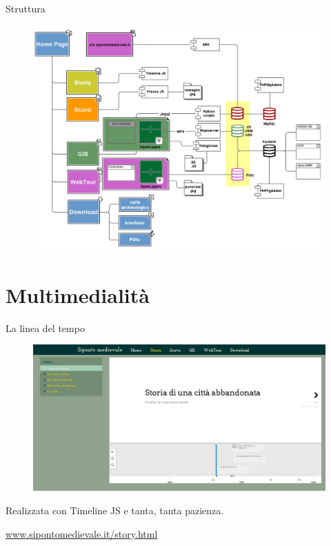 \documentclass{beamer}
\begin{document}
		\begin{frame}{Struttura}
			\begin{figure}[]
				\begin{center}
					\includegraphics[width=1.0\linewidth,trim=7 20 20 20,clip=true]{struct}
				\end{center}
				\label{fig:struct}
			\end{figure}
		\end{frame}

	\section{Multimedialità}

		\begin{frame}{La linea del tempo}
			\begin{figure}[]
				\begin{center}
					\includegraphics[width=1\linewidth]{timeline}
				\end{center}
				\label{fig:timeline}
			\end{figure}
			Realizzata con Timeline JS e tanta, tanta pazienza.\\
			\begin{center}\url{www.sipontomedievale.it/story.html}\end{center}
		\end{frame}
\end{document}
